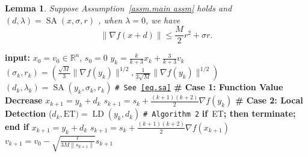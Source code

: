 \documentclass{article}
\theoremstyle{plain}
\newtheorem{lemma}[theorem]{Lemma}
\theoremstyle{definition}
\theoremstyle{remark}
\newcommand{\atr}{\texttt{ATR}}
\begin{document}
\begin{lemma}
    \label{lem.bound next gradient}
    Suppose Assumption~\ref{assm.main assm} holds and $(d,\lambda)= \operatorname{SA}(x,\sigma,r)$ , when $\lambda=0$, we have
    \begin{equation}
        \label{eq.bound next gradient}
        \|\nabla f(x+d)\| \leq \frac{M}{2}r^2+\sigma r.
    \end{equation}
\end{lemma}



\begin{algorithm}[ht]
    \caption{Accelerated Trust-Region Method (\atr{})}\label{alg.accelerated utr}
    \begin{algorithmic}[1]
        \STATE \textbf{input:} $x_0=v_0\in \mathbb{R}^n$, $s_0=0$
        \STATE $y_k = \frac{k}{k+3}x_k+\frac{3}{k+3}v_k$
        \STATE $(\sigma_k,r_k) = (\tfrac{\sqrt{M}}{3}\|\nabla f(y_k)\|^{1/2},\tfrac{1}{3\sqrt{M}}\|\nabla f(y_k)\|^{1/2})$
        \STATE $(d_k,\lambda_k) = \operatorname{SA}(y_k,\sigma_k,r_k)$ \hfill\texttt{\# See \eqref{eq.sa}}
         \label{line.if}
        \STATE \textbf{\# Case 1: Function Value Decrease}
        \STATE $x_{k+1}=y_k+d_k$
        \STATE $s_{k+1} = s_{k}+\frac{(k+1)(k+2)}{2}\nabla f(y_k)$
        \ELSE \label{line.else}
        \STATE \textbf{\# Case 2: Local Detection}
        \STATE ($d_k,\textrm{ET}) = \operatorname{LD}(y_k,d_k)$ \hfill\texttt{\# Algorithm 2}
            \STATE \textbf{if}~\textrm{ET}\textbf{; then terminate; end if}
            \STATE $x_{k+1}=y_k+d_k$
            \STATE $s_{k+1} = s_{k}+\tfrac{(k+1)(k+2)}{2}\nabla f(x_{k+1})$
            \ENDIF
            \STATE $v_{k+1} = v_0-\sqrt{\tfrac{\ell}{3M\|s_{k+1}\|}}s_{k+1}$
        \ENDFOR
    \end{algorithmic}
\end{algorithm}
\end{document}

